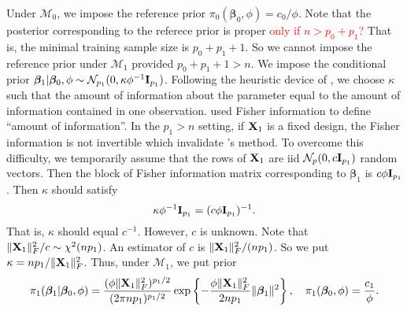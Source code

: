 \documentclass[11pt]{article}
\newcommand\CG[1]{\textcolor{red}{#1}}
\newcommand{\bfsym}[1]{\ensuremath{\boldsymbol{#1}}}
\def\bbeta{\bfsym \beta}
\theoremstyle{plain}
\theoremstyle{definition}
\theoremstyle{remark}
\begin{document}
Under $\mathcal M_0$, we impose the reference prior $\pi_0 (\bbeta_0,\phi)=c_0/\phi$.
Note that the posterior corresponding to the referece prior is proper \CG{only if $n>p_0 + p_1$?}
That is, the minimal training sample size is $p_0 + p_1 +1$.
So we cannot impose the reference prior under $\mathcal M_1$ provided $p_0 + p_1 +1 >n$.
We impose the conditional prior $\bbeta_1|\bbeta_0, \phi \sim \mathcal N_{p_1} (0, \kappa \phi^{-1} \BI_{p_1}) $.
Following the heuristic device of \cite{Kass1995}, we choose $\kappa$ such that the amount of information about the parameter equal to the amount of information contained in one observation.
\cite{Kass1995} used Fisher information to define ``amount of information''.
In the $p_1>n$ setting, if $\mathbf{X}_1$ is a fixed design, the Fisher information is not invertible which invalidate \cite{Kass1995}'s method.
To overcome this difficulty, we temporarily assume that the rows of $\mathbf{X}_1$ are iid $\mathcal N_p (0, c \mathbf{I}_{p_1} )$ random vectors.
Then the block of Fisher information matrix corresponding to $\bbeta_1$ is
$c\phi \mathbf{I}_{p_1}$.
Then $\kappa$ should satisfy
\begin{equation*}
    \kappa \phi^{-1} \mathbf{I}_{p_1}  = (c\phi \mathbf{I}_{p_1})^{-1}.
\end{equation*}
That is, $\kappa$ should equal $c^{-1}$.
However, $c$ is unknown.
Note that $\|\mathbf{X}_1\|_F^2/c\sim \chi^2(n p_1)$.
An estimator of $c$ is $\|\mathbf{X}_1\|_F^2/(np_1)$.
So we put $\kappa=np_1/\|\mathbf{X}_1\|_F^2$.
Thus, under $\mathcal M_1$, we put prior
\begin{equation*}
    \pi_1 (\bbeta_1 | \bbeta_0, \phi) =\frac{(\phi \|\BX_1\|_F^2)^{p_1/2}}{(2\pi n p_1 )^{p_1/2}}  
    \exp\left\{
        -\frac{\phi \|\BX_1\|_F^2}{2 n p_1} \|\bbeta_1\|^2
    \right\}
    ,\quad
    \pi_1(\bbeta_0, \phi) = \frac{c_1}{\phi}.
\end{equation*}
\end{document}
